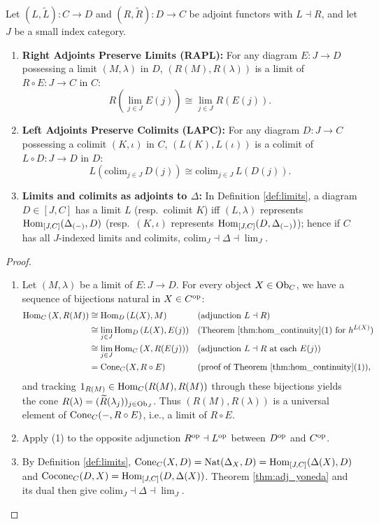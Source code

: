 \documentclass[10pt,a4paper]{article}
\renewcommand{\myprf}{\begin{proof}}
\renewcommand{\myqed}{\end{proof}}
\begin{document}
\begin{theorem}\label{thm:rapl_lapc}
Let $(L, \widetilde{L}) : C \to D$ and $(R, \widetilde{R}) : D \to C$ be adjoint functors with $L \dashv R$, and let $J$ be a small index category.
\begin{enumerate}
\item \textbf{Right Adjoints Preserve Limits (RAPL):} For any diagram $E : J \to D$ possessing a limit $(M, \lambda)$ in $D$, $(R(M), R(\lambda))$ is a limit of $R \circ E : J \to C$ in $C$:
$$R\left(\lim_{j \in J} E(j)\right) \cong \lim_{j \in J} R(E(j)).$$
\item \textbf{Left Adjoints Preserve Colimits (LAPC):} For any diagram $D : J \to C$ possessing a colimit $(K, \iota)$ in $C$, $(L(K), L(\iota))$ is a colimit of $L \circ D : J \to D$ in $D$:
$$L\left(\mathrm{colim}_{j \in J}\, D(j)\right) \cong \mathrm{colim}_{j \in J}\, L(D(j)).$$
\item \textbf{Limits and colimits as adjoints to $\Delta$:} In Definition \ref{def:limits}, a diagram $D \in [J, C]$ has a limit $L$ (resp.\ colimit $K$) iff $(L, \lambda)$ represents ${\textrm{Hom}}_{[J,C]}(\Delta_{(-)}, D)$ (resp.\ $(K, \iota)$ represents ${\textrm{Hom}}_{[J,C]}(D, \Delta_{(-)})$); hence if $C$ has all $J$-indexed limits and colimits, $\mathrm{colim}_J \dashv \Delta \dashv \lim_J$.
\end{enumerate}
\end{theorem}
\myprf
\begin{enumerate}
\item Let $(M, \lambda)$ be a limit of $E : J \to D$. For every object $X \in {\textrm{Ob}}_C$, we have a sequence of bijections natural in $X \in C^{\textrm{op}}$:
\begin{align*}
{\textrm{Hom}}_C\left(X, R(M)\right) &\cong {\textrm{Hom}}_D\left(L(X), M\right) && \text{(adjunction $L \dashv R$)} \\
&\cong \lim_{j \in J} {\textrm{Hom}}_D\left(L(X), E(j)\right) && \text{(Theorem \ref{thm:hom_continuity}(1) for $h^{L(X)}$)} \\
&\cong \lim_{j \in J} {\textrm{Hom}}_C\left(X, R(E(j))\right) && \text{(adjunction $L \dashv R$ at each $E(j)$)} \\
&= {\mathrm{Cone}}_C(X, R \circ E) && \text{(proof of Theorem \ref{thm:hom_continuity}(1))},
\end{align*}
and tracking $1_{R(M)} \in {\textrm{Hom}}_C(R(M), R(M))$ through these bijections yields the cone $R(\lambda) = (\widetilde{R}(\lambda_j))_{j \in {\textrm{Ob}}_J}$. Thus $(R(M), R(\lambda))$ is a universal element of ${\mathrm{Cone}}_C(-, R \circ E)$, i.e., a limit of $R \circ E$.
\item Apply (1) to the opposite adjunction $R^{\textrm{op}} \dashv L^{\textrm{op}}$ between $D^{\textrm{op}}$ and $C^{\textrm{op}}$.
\item By Definition \ref{def:limits}, ${\mathrm{Cone}}_C(X, D) = {\textrm{Nat}}(\Delta_X, D) = {\textrm{Hom}}_{[J,C]}(\Delta(X), D)$ and ${\mathrm{Cocone}}_C(D, X) = {\textrm{Hom}}_{[J,C]}(D, \Delta(X))$. Theorem \ref{thm:adj_yoneda} and its dual then give $\mathrm{colim}_J \dashv \Delta \dashv \lim_J$.
\end{enumerate}
\myqed
\end{document}
